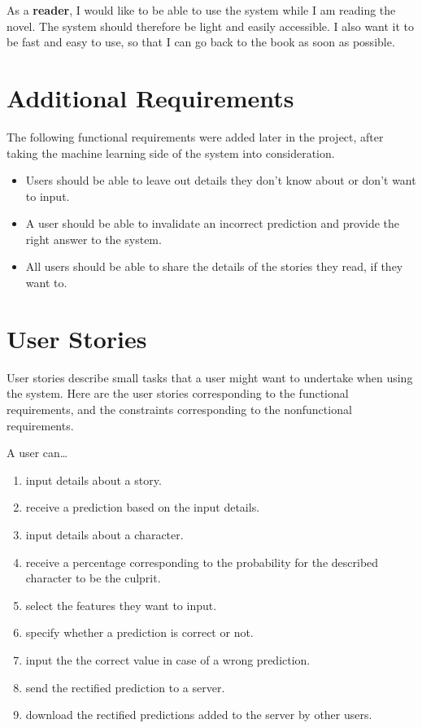 \documentclass{mproj}
\begin{document}
As a \textbf{reader}, I would like to be able to use the system while I am reading the novel. The system should therefore be light and easily accessible. I also want it to be fast and easy to use, so that I can go back to the book as soon as possible. 

\section{Additional Requirements}
	
The following functional requirements were added later in the project, after taking the machine learning side of the system into consideration.
\begin{itemize}
\item Users should be able to leave out details they don't know about or don't want to input.
\item A user should be able to invalidate an incorrect prediction and provide the right answer to the system. 
\item All users should be able to share the details of the stories they read, if they want to.
\end{itemize}

\section{User Stories}
	
User stories describe small tasks that a user might want to undertake when using the system. \cite{userstoriesbook} Here are the user stories corresponding to the functional requirements, and the constraints corresponding to the nonfunctional requirements. \par
	
A user can\ldots
\begin{enumerate}
	\item input details about a story.
	\item receive a prediction based on the input details.
	\item input details about a character.
	\item receive a percentage corresponding to the probability for the described character to be the culprit.
	\item select the features they want to input.
	\item specify whether a prediction is correct or not.
	\item input the the correct value in case of a wrong prediction.
	\item send the rectified prediction to a server.
	\item download the rectified predictions added to the server by other users. \par
\end{enumerate}
\end{document}
